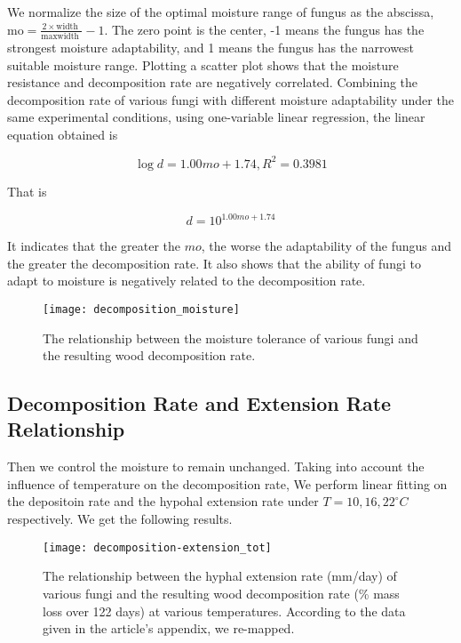 \documentclass{mcmthesis}
\begin{document}
We normalize the size of the optimal moisture range of fungus as the abscissa, $ \text {mo}=\frac{2 \times \text {width }}{\text {maxwidth }}-1 $. The zero point is the center, -1 means the fungus has the strongest moisture adaptability, and 1 means the fungus has the narrowest suitable moisture range. Plotting a scatter plot shows that the moisture resistance and decomposition rate are negatively correlated. Combining the decomposition rate of various fungi with different moisture adaptability under the same experimental conditions, using one-variable linear regression, the linear equation obtained is 

\begin{equation}
  \log {d}=1.00mo+1.74,R^2=0.3981
\end{equation}

That is

\begin{equation}
  {d}=10 ^{1.00mo+1.74}
\end{equation}

It indicates that the greater the $mo $, the worse the adaptability of the fungus and the greater the decomposition rate. It also shows that the ability of fungi to adapt to moisture is negatively related to the decomposition rate. 

\begin{figure}[H]
  \small
  \centering
  \texttt{[image: decomposition\_moisture]}
  \caption{The relationship between the moisture tolerance of various fungi and the resulting wood decomposition rate.}
  \label{decomposition_moisture}
\end{figure}

\subsection{Decomposition Rate and Extension Rate Relationship}

Then we control the moisture to remain unchanged. Taking into account the influence of temperature on the decomposition rate,  We perform linear fitting on the depositoin rate and the hypohal extension rate under $ T=10, 16, 22^{\circ}C $ respectively. We get the following results. 

\begin{figure}[H]
  \small
  \centering
  \texttt{[image: decomposition-extension\_tot]}
  \caption{The relationship between the hyphal extension rate (mm/day) of various fungi and the resulting wood decomposition rate (\% mass loss over 122 days) at various temperatures. \cite{lustenhouwer2020trait} According to the data given in the article's appendix, we re-mapped.}
  \label{decomposition-extension_tot}
\end{figure}
\end{document}
